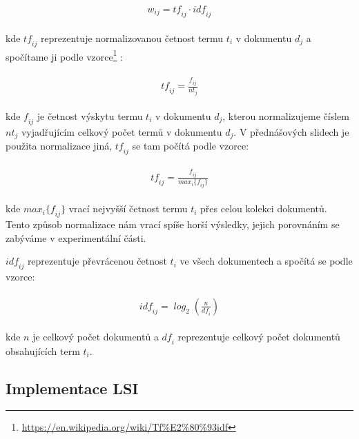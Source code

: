 \documentclass[11pt]{scrartcl} %
\begin{document}
\begin{align}
	\begin{split}
		\mathit{w_{ij} = tf_{ij} \cdot idf_{ij}}
	\end{split}					
\end{align}

kde $\mathit{tf_{ij}}$ reprezentuje normalizovanou četnost termu $t_i$ v dokumentu $d_j$ a spočítame ji podle vzorce\footnote{\url{https://en.wikipedia.org/wiki/Tf\%E2\%80\%93idf}} :

\begin{align}
	\begin{split}
		\mathit{tf_{ij} = \frac{f_{ij}}{nt_j}}
	\end{split}	
	\label{eq:first_normalization}				
\end{align}

kde $\mathit{f_{ij}}$ je četnost výskytu termu $t_i$ v dokumentu $d_j$, kterou normalizujeme číslem $\mathit{nt_j}$ vyjadřujícím celkový počet termů v dokumentu $d_j$. V přednášových slidech je použita normalizace jiná, $\mathit{tf_{ij}}$ se tam počítá podle vzorce:

\begin{align}
	\begin{split}
		\mathit{tf_{ij} = \frac{f_{ij}}{max_i\{f_{ij}\}}}
	\end{split}		
	\label{eq:second_normalization}			
\end{align}

kde $\mathit{max_i\{f_{ij}\}}$ vrací nejvyšší četnost termu $t_i$ přes celou kolekci dokumentů. Tento způsob normalizace nám vrací spíše horší výsledky, jejich porovnáním se zabýváme v experimentální části.

$\mathit{idf_{ij}}$ reprezentuje převrácenou četnost $t_i$ ve všech dokumentech a spočítá se podle vzorce:

\begin{align}
	\begin{split}
		\mathit{idf_{ij} = \log_2 (\frac{n}{df_i})}
	\end{split}					
\end{align}

kde $n$ je celkový počet dokumentů a $\mathit{df_i}$ reprezentuje celkový počet dokumentů obsahujících term $t_i$.

\subsection{Implementace LSI}
\end{document}
